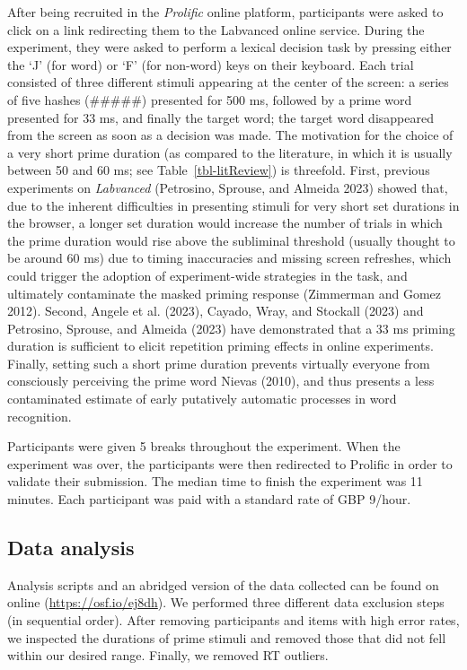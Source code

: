 \documentclass[
]{interact}
\begin{document}
After being recruited in the \emph{Prolific} online platform,
participants were asked to click on a link redirecting them to the
Labvanced online service. During the experiment, they were asked to
perform a lexical decision task by pressing either the `J' (for word) or
`F' (for non-word) keys on their keyboard. Each trial consisted of three
different stimuli appearing at the center of the screen: a series of
five hashes (\#\#\#\#\#) presented for 500 ms, followed by a prime word
presented for 33 ms, and finally the target word; the target word
disappeared from the screen as soon as a decision was made. The
motivation for the choice of a very short prime duration (as compared to
the literature, in which it is usually between 50 and 60 ms; see
Table~\ref{tbl-litReview}) is threefold. First, previous experiments on
\emph{Labvanced} (Petrosino, Sprouse, and Almeida 2023) showed that, due
to the inherent difficulties in presenting stimuli for very short set
durations in the browser, a longer set duration would increase the
number of trials in which the prime duration would rise above the
subliminal threshold (usually thought to be around 60 ms) due to timing
inaccuracies and missing screen refreshes, which could trigger the
adoption of experiment-wide strategies in the task, and ultimately
contaminate the masked priming response (Zimmerman and Gomez 2012).
Second, Angele et al. (2023), Cayado, Wray, and Stockall (2023) and
Petrosino, Sprouse, and Almeida (2023) have demonstrated that a 33 ms
priming duration is sufficient to elicit repetition priming effects in
online experiments. Finally, setting such a short prime duration
prevents virtually everyone from consciously perceiving the prime word
Nievas (2010), and thus presents a less contaminated estimate of early
putatively automatic processes in word recognition.

Participants were given 5 breaks throughout the experiment. When the
experiment was over, the participants were then redirected to Prolific
in order to validate their submission. The median time to finish the
experiment was 11 minutes. Each participant was paid with a standard
rate of GBP 9/hour.

\subsection{Data analysis}\label{sec-exp1-analysis}

Analysis scripts and an abridged version of the data collected can be
found on online (\url{https://osf.io/ej8dh}). We performed three
different data exclusion steps (in sequential order). After removing
participants and items with high error rates, we inspected the durations
of prime stimuli and removed those that did not fell within our desired
range. Finally, we removed RT outliers.
\end{document}
